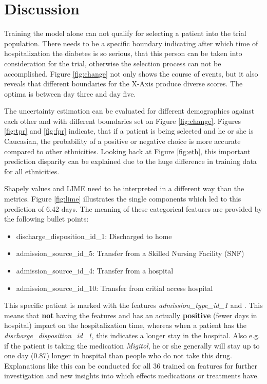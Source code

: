 \documentclass[journal]{IEEEtran}
\begin{document}
%
%
\section{Discussion}
Training the model alone can not qualify for selecting a patient into the trial population. There needs to be a specific boundary indicating after which time of hospitalization the diabetes is so serious, that this person can be taken into consideration for the trial, otherwise the selection process can not be accomplished. Figure \ref{fig:change} not only shows the course of events, but it also reveals that different boundaries for the X-Axis produce diverse scores. The optima is between day three and day five. 

The uncertainty estimation can be evaluated for different demographics against each other and with different boundaries set on Figure \ref{fig:change}. Figures \ref{fig:tpr} and \ref{fig:fpr} indicate, that if a patient is being selected and he or she is Caucasian, the probability of a positive or negative choice is more accurate compared to other ethnicities. Looking back at Figure \ref{fig:eth}, this important prediction disparity can be explained due to the huge difference in training data for all ethnicities.

Shapely values and LIME need to be interpreted in a different way than the metrics. Figure \ref{fig:lime} illustrates the single components which led to this prediction of 6.42 days. The meaning of these categorical features are provided by the following bullet points: \\

\begin{itemize}
	\item discharge\_disposition\_id\_1: Discharged to home
	\item admission\_source\_id\_5: Transfer from a Skilled Nursing Facility (SNF)
	\item admission\_source\_id\_4: Transfer from a hospital
	\item admission\_source\_id\_10: Transfer from critial access hospital \\
\end{itemize}

This specific patient is marked with the features \textit{admission\_type\_id\_1} and . This means that \textbf{not} having the features  and  has an actually \textbf{positive} (fewer days in hospital) impact on the hospitalization time, whereas when a patient has the \textit{discharge\_disposition\_id\_1}, this indicates a longer stay in the hospital. Also e.g. if the patient is taking the medication \textit{Migitol}, he or she generally will stay up to one day (0.87) longer in hospital than people who do not take this drug. Explanations like this can be conducted for all 36 trained on features for further investigation and new insights into which effects medications or treatments have.
\end{document}
